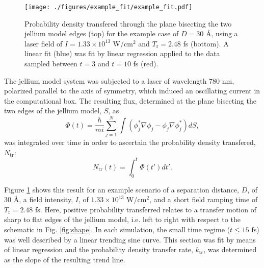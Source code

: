 \documentclass[%
 reprint,
 amsmath,amssymb,
pra,
tightenlines
]{revtex4-1}
\newcommand{\rev}[1]{{\color{red} #1}}
\begin{document}




\begin{figure}[ht]
	\texttt{[image: ./figures/example\_fit/example\_fit.pdf]}
	\caption{\rev{Probability density transfered through the plane bisecting the two jellium model edges (top) for the example case of $D=30$ {\AA}, using a laser field of $I=1.33 \times 10^{13}$ W/$\text{cm}^2$ and $T_\text{r}=2.48$ fs (bottom).} A linear fit (blue) was fit by linear regression applied to the data sampled between $t=3$ and $t=10$ fs (red).}
\label{fig:example_fit}
\end{figure} 

 The jellium model system was subjected to a laser of wavelength 780 nm, polarized parallel to the axis of symmetry, which induced an oscillating current in the computational box. \rev{The resulting flux, determined at the plane bisecting the two edges of the jellium model, $S$, as 
\begin{equation}
\Phi(t)= \frac{\hbar}{mi}\sum_{j=1}^N\int\left(\phi_j^*\nabla\phi_j-\phi_j\nabla\phi_j^*\right)dS, 
\end{equation}
was integrated over time in order to ascertain the probability density transfered, $N_\text{tr}$:
\begin{equation}
N_\text{tr}(t)=\int_0^t \Phi(t')dt'.
\end{equation}}

Figure \ref{fig:example_fit} shows this result for an example scenario of a separation distance, $D$, of 30 {\AA}, a field intensity, $I$, of $1.33 \times 10^{13}$ W/$\text{cm}^2$, and a short field ramping time of $T_\text{r}=2.48$ fs. Here, positive probability transferred relates to a transfer motion of sharp to flat edges of the jellium model, i.e. left to right with respect to the schematic in Fig. \ref{fig:shape}. In each simulation, the small time regime ($t\le15$ fs) was well described by a linear trending sine curve. This section was fit by means of linear regression and the probability density transfer rate, $k_\text{tr}$, was determined as the slope of the resulting trend line. 
\end{document}
